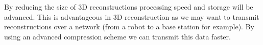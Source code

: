 By reducing the size of 3D reconstructions processing speed and storage will be advanced. This is advantageous in 3D reconstruction as we may want to transmit reconstructions over a network (from a robot to a base station for example). By using an advanced compression scheme we can transmit this data faster. 
